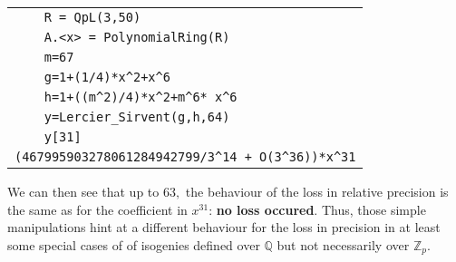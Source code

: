 \documentclass[sigconf]{acmart}
\theoremstyle{definition}
\begin{document}
\begin{tabular}{|l|}
\verb?    R = QpL(3,50)? \\
\verb?    A.<x> = PolynomialRing(R)?\\
\verb?    m=67?\\
\verb?    g=1+(1/4)*x^2+x^6?\\
\verb?    h=1+((m^2)/4)*x^2+m^6* x^6?\\
\verb?    y=Lercier_Sirvent(g,h,64)?\\
\verb?    y[31]?\\
\verb?(467995903278061284942799/3^14 + O(3^36))*x^31?\\
\end{tabular}

We can then see that up to $63,$ the behaviour
of the loss in relative precision is the same
as for the coefficient in $x^{31}$: \textbf{no loss
occured}.
Thus, those simple manipulations
hint at a different behaviour for the loss 
in precision in at least some special cases of
of isogenies defined over $\mathbb{Q}$
but not necessarily over $\mathbb{Z}_p.$ 



\end{document}
